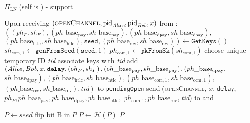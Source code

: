 \begin{protocolbox}{$\Pi_{\mathrm{LN}}$ (self is \alice) - support}
\begin{algorithmic}[1]
    \State Upon receiving $\left(\textsc{openChannel}, \mathrm{pid}_{\mathit{Alice}},
    \mathrm{pid}_{\mathit{Bob}}, x\right)$ from \environment:
    \Indent
      \State $\left(\left(ph_F, sh_F\right),
      \left(ph\_\mathrm{base}_{\mathrm{pay}},
      sh\_\mathrm{base}_{\mathrm{pay}}\right),
      \left(ph\_\mathrm{base}_{\mathrm{dpay}},
      sh\_\mathrm{base}_{\mathrm{dpay}}\right),\right.$
      $\left.\left(ph\_\mathrm{base}_{\mathrm{htlc}},
      sh\_\mathrm{base}_{\mathrm{htlc}}\right), \mathtt{seed},
      \left(ph\_\mathrm{base}_{\mathrm{rev}},
      sh\_\mathrm{base}_{\mathrm{rev}}\right)\right) \gets
      \texttt{GetKeys}\left(\right)$
      \State $sh_{\mathrm{com}, 1} \gets
      \texttt{genFromSeed}\left(\mathtt{seed}, 1\right)$
      \State $ph_{\mathrm{com}, 1} \gets
      \mathtt{pkFromSk}\left(sh_{\mathrm{com}, 1}\right)$
      \State choose unique temporary ID \textit{tid} 
      \State associate keys with \textit{tid}
      \State add $\left(\mathit{Alice}, \mathit{Bob}, x, \mathtt{delay}, \left(ph_F,
      sh_F\right), \left(ph\_\mathrm{base}_{\mathrm{pay}},
      sh\_\mathrm{base}_{\mathrm{pay}}\right),
      \left(ph\_\mathrm{base}_{\mathrm{dpay}},\right.\right.$
      $\left.\left.sh\_\mathrm{base}_{\mathrm{dpay}}\right),
      \left(ph\_\mathrm{base}_{\mathrm{htlc}},
      sh\_\mathrm{base}_{\mathrm{htlc}}\right),
      \left(ph\_\mathrm{base}_{\mathrm{com}, 1},
      sh\_\mathrm{base}_{\mathrm{com}, 1}\right),\right.$
      $\left.\left(ph\_\mathrm{base}_{\mathrm{rev}},
      sh\_\mathrm{base}_{\mathrm{rev}}\right), \mathit{tid}\right)$ to
      \texttt{pendingOpen}
      \State send (\textsc{openChannel}, $x$, \texttt{delay}, $ph_F,
      ph\_\mathrm{base}_{\mathrm{pay}}, ph\_\mathrm{base}_{\mathrm{dpay}},
      ph\_\mathrm{base}_{\mathrm{htlc}},$ $ph_{\mathrm{com}, 1},
      ph\_\mathrm{base}_{\mathrm{rev}}$, \textit{tid}) to \bob{} and \adversary
    \EndIndent
    \State

     
      \State $P \gets seed$
          \State flip bit B in $P$
          \State $P \gets \mathcal{H}(P)$
        \EndIf
      \EndFor
      \State \Return $P$
    \EndFunction
    \State
  \end{algorithmic}
\end{protocolbox}

